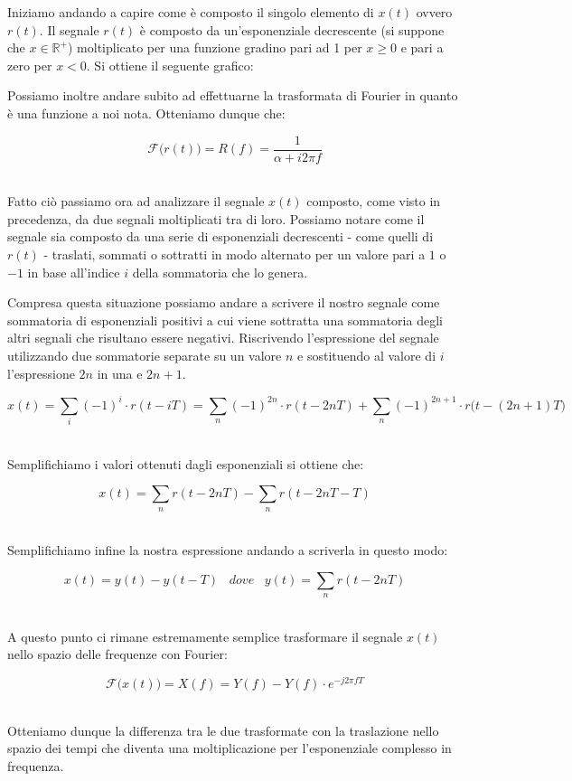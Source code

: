 \documentclass[../main.tex]{subfiles}
\begin{document}
Iniziamo andando a capire come è composto il singolo elemento di $x(t)$ ovvero $r(t)$. Il segnale $r(t)$ è composto da un'esponenziale decrescente (si suppone che $x \in \mathbb{R^+}$) moltiplicato per una funzione gradino pari ad 1 per $x \geq 0$ e pari a zero per $x < 0$.
Si ottiene il seguente grafico:


Possiamo inoltre andare subito ad effettuarne la trasformata di Fourier in quanto è una funzione a noi nota. Otteniamo dunque che:

\[ \mathcal{F} \big(r(t)\big) = R(f) = \frac{1}{\alpha + i2\pi f} \]\

Fatto ciò passiamo ora ad analizzare il segnale $x(t)$ composto, come visto in precedenza, da due segnali moltiplicati tra di loro. Possiamo notare come il segnale sia composto da una serie di esponenziali decrescenti - come quelli di $r(t)$ - traslati, sommati o sottratti in modo alternato per un valore pari a $1$ o $-1$ in base all'indice $i$ della sommatoria che lo genera.

Compresa questa situazione possiamo andare a scrivere il nostro segnale come sommatoria di esponenziali positivi a cui viene sottratta una sommatoria degli altri segnali che risultano essere negativi.
Riscrivendo l'espressione del segnale utilizzando due sommatorie separate su un valore $n$ e sostituendo al valore di $i$ l'espressione $2n$ in una e $2n + 1$.

\[ x(t) = \sum_i (-1)^i  \cdot r(t - iT) = \sum_n (-1)^{2n} \cdot r(t - 2nT) +  \sum_n  (-1)^{2n+1} \cdot r\big(t - (2n+1)T\big) \]\

Semplifichiamo i valori ottenuti dagli esponenziali si ottiene che:

\[x(t) = \sum_n r(t - 2nT) - \sum_n r(t - 2nT - T) \]\

Semplifichiamo infine la nostra espressione andando a scriverla in questo modo:

\[x(t) = y(t) - y(t - T) \hspace{10pt} \unit{dove} \hspace{10pt} y(t) = \sum_n r(t - 2nT)\]\

A questo punto ci rimane estremamente semplice trasformare il segnale $x(t)$ nello spazio delle frequenze con Fourier:

\[ \mathcal{F}\big(x(t)\big) = X(f) = Y(f) - Y(f) \cdot e^{-j2\pi fT}  \]\

Otteniamo dunque la differenza tra le due trasformate con la traslazione nello spazio dei tempi che diventa una moltiplicazione per l'esponenziale complesso in frequenza.
\end{document}
